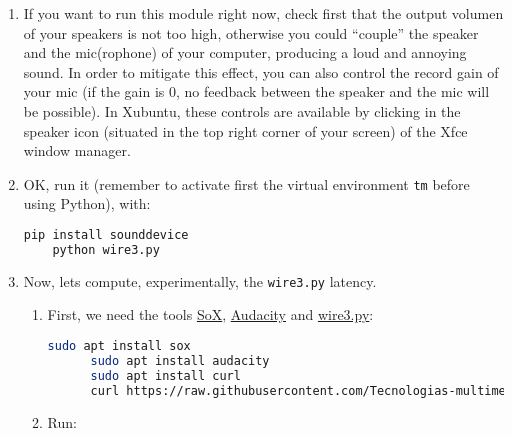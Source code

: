\begin{enumerate}
\item If you want to run this module right now, check first that the
  output volumen of your speakers is not too high, otherwise you could
  ``couple'' the speaker and the mic(rophone) of your computer,
  producing a loud and annoying sound. In order to mitigate this
  effect, you can also control the record gain of your mic (if the
  gain is 0, no feedback between the speaker and the mic will be
  possible). In Xubuntu, these controls are available by clicking in
  the speaker icon (situated in the top right corner of your screen)
  of the Xfce window manager.

\item OK, run it (remember to activate first the virtual environment
  \texttt{tm} before using Python), with:

  \begin{lstlisting}[language=Bash]
    pip install sounddevice
    python wire3.py
  \end{lstlisting}


\item Now, lets compute, experimentally, the \texttt{wire3.py}
  latency.

  \begin{enumerate} \item First, we need the
  tools \href{http://sox.sourceforge.net/}{SoX}, \href{https://www.audacityteam.org/}{Audacity}
  and \href{https://raw.githubusercontent.com/Tecnologias-multimedia/intercom/master/test/sounddevice/wire3.py}{wire3.py}:
  
    \begin{lstlisting}[language=Bash]
      sudo apt install sox
      sudo apt install audacity
      sudo apt install curl
      curl https://raw.githubusercontent.com/Tecnologias-multimedia/intercom/master/test/sounddevice/plot_input.py > plot_input.py
    \end{lstlisting}

  \item Run:


\end{enumerate}
\end{enumerate}
